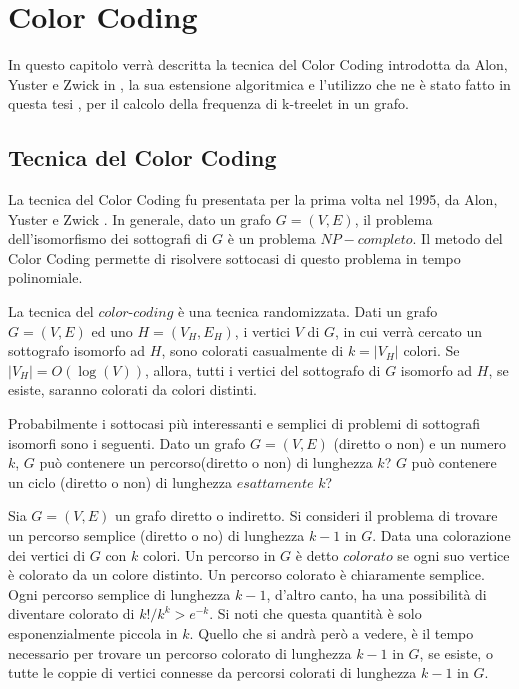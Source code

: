 \chapter{Color Coding}

In questo capitolo verr\`a descritta la tecnica del Color Coding introdotta da Alon, Yuster e Zwick  in \cite{alon1995color} , la sua estensione algoritmica e l'utilizzo che ne \`e stato fatto in questa tesi , per il calcolo della frequenza di k-treelet in un grafo.

\section{Tecnica del Color Coding}

La tecnica del Color Coding fu presentata per la prima volta nel 1995, da Alon, Yuster e Zwick \cite{alon1995color}.
In generale, dato un grafo $G = (V,E)$, il problema dell'isomorfismo dei sottografi  di $G$ \`e un problema $NP-completo$.
Il metodo del Color Coding permette di risolvere sottocasi di questo problema in tempo polinomiale.

La tecnica del $color$-$coding$ \`e una tecnica randomizzata. Dati un grafo $ G = (V,E) $ ed uno $H = (V_H, E_H)$, i vertici $V$ di $G$, in cui verr\`a cercato un  sottografo isomorfo ad $H$, sono colorati casualmente di $k = |V_H|$ colori. Se $|V_H| = O(\log(V))$, allora, tutti i vertici del sottografo di $G$ isomorfo ad $H$, se esiste, saranno colorati da colori distinti.   

Probabilmente i sottocasi pi\`u interessanti e semplici di problemi di sottografi isomorfi sono i seguenti.
Dato un grafo $G=(V,E)$ (diretto o non) e un numero $k$, $G$ pu\`o contenere un percorso(diretto o non) di lunghezza $k$? $G$ pu\`o contenere un ciclo (diretto o non) di lunghezza $esattamente$ $k$?

Sia $G=(V,E)$ un grafo diretto o indiretto. Si consideri il problema di trovare un percorso semplice (diretto o no) di lunghezza $k-1$ in $G$. Data una colorazione dei vertici di $G$ con $k$ colori. Un percorso in $G$ \`e detto $colorato$ se ogni suo vertice \`e colorato da un colore distinto. Un percorso colorato \`e chiaramente semplice. Ogni percorso semplice di lunghezza $k-1$, d'altro canto, ha una possibilit\`a di diventare colorato di $k!/k^k>e^{-k}$. Si noti che questa quantit\`a \`e solo esponenzialmente piccola in $k$. Quello che si andr\`a per\`o a vedere, \`e il tempo  necessario per trovare un percorso colorato di lunghezza $k-1$ in $G$, se esiste, o tutte le coppie di vertici connesse da percorsi colorati di lunghezza $k-1$ in $G$.

